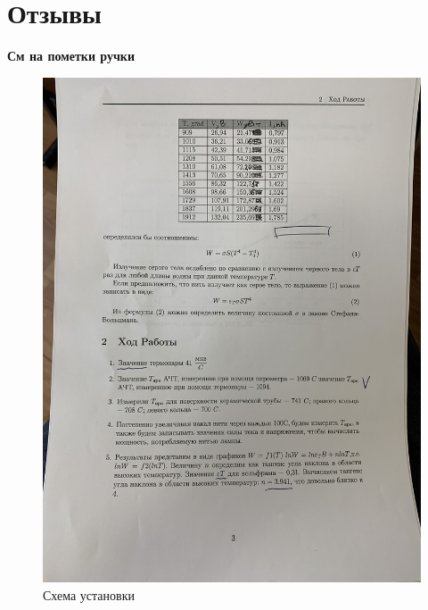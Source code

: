 \documentclass[a4paper,12pt]{article}
\theoremstyle{plain} %
\theoremstyle{definition} %
\theoremstyle{remark} %
\begin{document}
\newpage

\section{Отзывы}

\begin{center}
    \textbf{См на пометки ручки}
\end{center}


\begin{figure}[h]
        \includegraphics[width=1 \textwidth, angle = 270]{Materials/graph/IMG_2481.JPG}
    \caption{Схема установки}
\end{figure}
\end{document}
